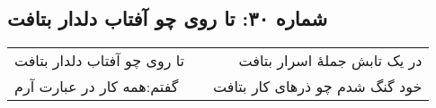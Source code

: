 \begin{center}
\section*{شماره ۳۰: تا روی چو آفتاب دلدار بتافت}
\label{sec:030}
\begin{longtable}{l p{0.5cm} r}
تا روی چو آفتاب دلدار بتافت
&&
در یک تابش جملهٔ اسرار بتافت
\\
گفتم‌:همه کار در عبارت آرم
&&
خود گنگ شدم چو ذرهای کار بتافت
\\
\end{longtable}
\end{center}
